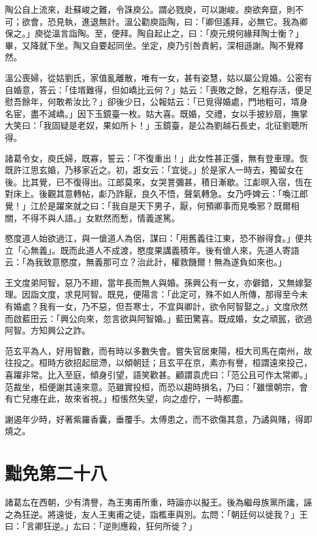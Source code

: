 陶公自上流來，赴蘇峻之難，令誅庾公。謂必戮庾，可以謝峻。庾欲奔竄，則不可；欲會，恐見執，進退無計。溫公勸庾詣陶，曰：「卿但遙拜，必無它。我為卿保之。」庾從溫言詣陶。至，便拜。陶自起止之，曰：「庾元規何緣拜陶士衡？」畢，又降就下坐。陶又自要起同坐。坐定，庾乃引咎責躬，深相遜謝。陶不覺釋然。

溫公喪婦，從姑劉氏，家值亂離散，唯有一女，甚有姿慧，姑以屬公覓婚。公密有自婚意，答云：「佳壻難得，但如嶠比云何？」姑云：「喪敗之餘，乞粗存活，便足慰吾餘年，何敢希汝比？」卻後少日，公報姑云：「已覓得婚處，門地粗可，壻身名宦，盡不減嶠。」因下玉鏡臺一枚。姑大喜。既婚，交禮，女以手披紗扇，撫掌大笑曰：「我固疑是老奴，果如所卜！」玉鏡臺，是公為劉越石長史，北征劉聰所得。

諸葛令女，庾氏婦，既寡，誓云：「不復重出！」此女性甚正彊，無有登車理。恢既許江思玄婚，乃移家近之。初，誑女云：「宜徙。」於是家人一時去，獨留女在後。比其覺，已不復得出。江郎莫來，女哭詈彌甚，積日漸歇。江虨暝入宿，恆在對床上。後觀其意轉帖，虨乃詐厭，良久不悟，聲氣轉急。女乃呼婢云：「喚江郎覺！」江於是躍來就之曰：「我自是天下男子，厭，何預卿事而見喚邪？既爾相關，不得不與人語。」女默然而慙，情義遂篤。

愍度道人始欲過江，與一傖道人為侶，謀曰：「用舊義往江東，恐不辦得食。」便共立「心無義」。既而此道人不成渡，愍度果講義積年。後有傖人來，先道人寄語云：「為我致意愍度，無義那可立？治此計，權救饑爾！無為遂負如來也。」

王文度弟阿智，惡乃不翅，當年長而無人與婚。孫興公有一女，亦僻錯，又無嫁娶理。因詣文度，求見阿智。既見，便陽言：「此定可，殊不如人所傳，那得至今未有婚處？我有一女，乃不惡，但吾寒士，不宜與卿計，欲令阿智娶之。」文度欣然而啟藍田云：「興公向來，忽言欲與阿智婚。」藍田驚喜。既成婚，女之頑嚚，欲過阿智。方知興公之詐。

范玄平為人，好用智數，而有時以多數失會。嘗失官居東陽，桓大司馬在南州，故往投之。桓時方欲招起屈滯，以傾朝廷；且玄平在京，素亦有譽，桓謂遠來投己，喜躍非常。比入至庭，傾身引望，語笑歡甚。顧謂袁虎曰：「范公且可作太常卿。」范裁坐，桓便謝其遠來意。范雖實投桓，而恐以趨時損名，乃曰：「雖懷朝宗，會有亡兒瘞在此，故來省視。」桓悵然失望，向之虛佇，一時都盡。

謝遏年少時，好著紫羅香囊，垂覆手。太傅患之，而不欲傷其意，乃譎與賭，得即燒之。



\chapter{黜免第二十八}

諸葛厷在西朝，少有清譽，為王夷甫所重，時論亦以擬王。後為繼母族黨所讒，誣之為狂逆。將遠徙，友人王夷甫之徒，詣檻車與別。厷問：「朝廷何以徙我？」王曰：「言卿狂逆。」厷曰：「逆則應殺，狂何所徙？」

